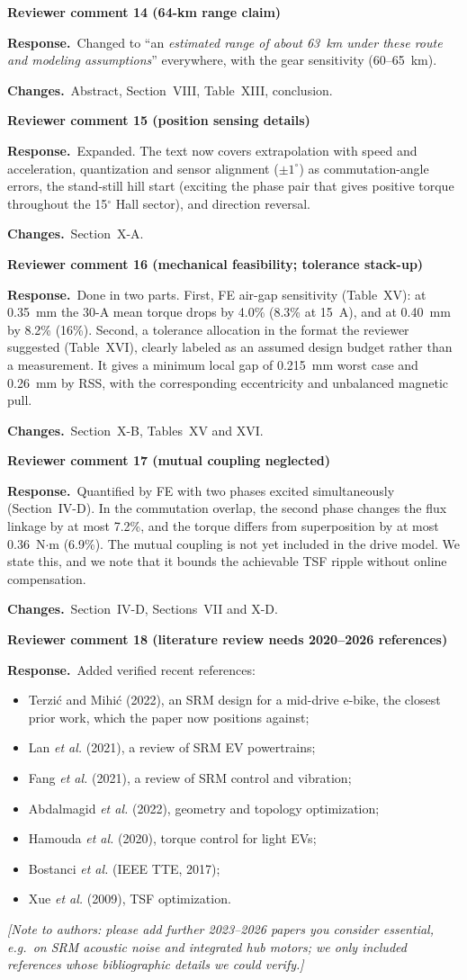 \documentclass[10pt]{article}
\newcommand{\rev}[1]{\par\medskip\noindent\textbf{Reviewer comment #1}\par}
\newcommand{\resp}{\par\noindent\textcolor{blue!50!black}{\textbf{Response.}}~}
\newcommand{\chg}{\par\noindent\textcolor{green!35!black}{\textbf{Changes.}}~}
\begin{document}
\rev{14 (64-km range claim)}
\resp Changed to ``an \emph{estimated range of about 63~km under these route
and modeling assumptions}'' everywhere, with the gear sensitivity (60--65~km).
\chg Abstract, Section~VIII, Table~XIII, conclusion.

\rev{15 (position sensing details)}
\resp Expanded. The text now covers extrapolation with speed and acceleration,
quantization and sensor alignment ($\pm1^\circ$) as commutation-angle errors,
the stand-still hill start (exciting the phase pair that gives positive torque
throughout the 15$^\circ$ Hall sector), and direction reversal.
\chg Section~X-A.

\rev{16 (mechanical feasibility; tolerance stack-up)}
\resp Done in two parts. First, FE air-gap sensitivity (Table~XV): at 0.35~mm
the 30-A mean torque drops by 4.0\% (8.3\% at 15~A), and at 0.40~mm by 8.2\%
(16\%). Second, a tolerance allocation in the format the reviewer suggested
(Table~XVI), clearly labeled as an assumed design budget rather than a
measurement. It gives a minimum local gap of 0.215~mm worst case and 0.26~mm
by RSS, with the corresponding eccentricity and unbalanced magnetic pull.
\chg Section~X-B, Tables~XV and XVI.

\rev{17 (mutual coupling neglected)}
\resp Quantified by FE with two phases excited simultaneously (Section~IV-D).
In the commutation overlap, the second phase changes the flux linkage by at
most 7.2\%, and the torque differs from superposition by at most
0.36~N$\cdot$m (6.9\%). The mutual coupling is not yet included in the drive
model. We state this, and we note that it bounds the achievable TSF ripple
without online compensation.
\chg Section~IV-D, Sections~VII and X-D.

\rev{18 (literature review needs 2020--2026 references)}
\resp Added verified recent references:
\begin{itemize}[nosep]
\item Terzi\'c and Mihi\'c (2022), an SRM design for a mid-drive e-bike, the
closest prior work, which the paper now positions against;
\item Lan \emph{et al.} (2021), a review of SRM EV powertrains;
\item Fang \emph{et al.} (2021), a review of SRM control and vibration;
\item Abdalmagid \emph{et al.} (2022), geometry and topology optimization;
\item Hamouda \emph{et al.} (2020), torque control for light EVs;
\item Bostanci \emph{et al.} (IEEE TTE, 2017);
\item Xue \emph{et al.} (2009), TSF optimization.
\end{itemize}
\emph{[Note to authors: please add further 2023--2026 papers you consider
essential, e.g.\ on SRM acoustic noise and integrated hub motors; we only
included references whose bibliographic details we could verify.]}
\end{document}
